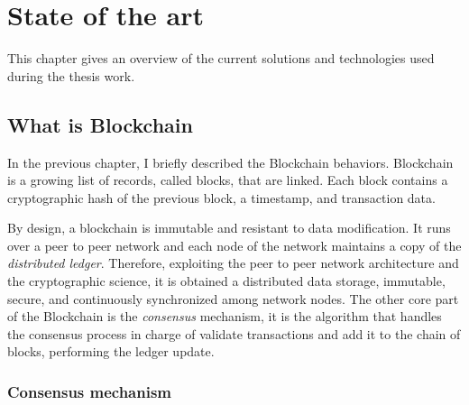 \chapter{State of the art}

This chapter gives an overview of the current solutions and technologies used during the thesis work.

\section{What is Blockchain}

In the previous chapter, I briefly described the Blockchain behaviors. Blockchain is a growing list of records, called 
blocks, that are linked. Each block contains a cryptographic hash of the previous block, a timestamp, and transaction 
data.\cite{blockchain-definition}

By design, a blockchain is immutable and resistant to data modification. It runs over a peer to peer network and each
node of the network maintains a copy of the \textit{distributed ledger}. Therefore, exploiting the peer to peer network 
architecture and the cryptographic science, it is obtained a distributed data storage, immutable, secure, and continuously 
synchronized among network nodes. The other core part of the Blockchain is the \textit{consensus} mechanism, it is the 
algorithm that handles the consensus process in charge of validate transactions and add it to the chain of blocks, 
performing the ledger update.

\subsection{Consensus mechanism}

